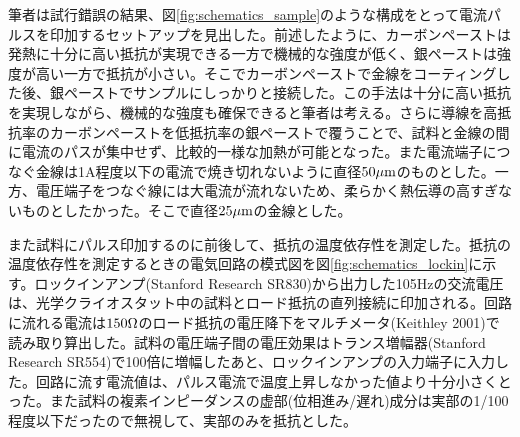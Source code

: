 筆者は試行錯誤の結果、図\ref{fig:schematics_sample}のような構成をとって電流パルスを印加するセットアップを見出した。前述したように、カーボンペーストは発熱に十分に高い抵抗が実現できる一方で機械的な強度が低く、銀ペーストは強度が高い一方で抵抗が小さい。そこでカーボンペーストで金線をコーティングした後、銀ペーストでサンプルにしっかりと接続した。この手法は十分に高い抵抗を実現しながら、機械的な強度も確保できると筆者は考える。さらに導線を高抵抗率のカーボンペーストを低抵抗率の銀ペーストで覆うことで、試料と金線の間に電流のパスが集中せず、比較的一様な加熱が可能となった。また電流端子につなぐ金線は1A程度以下の電流で焼き切れないように直径$\rm 50 \mu m$のものとした。一方、電圧端子をつなぐ線には大電流が流れないため、柔らかく熱伝導の高すぎないものとしたかった。そこで直径$\rm 25 \mu m$の金線とした。

また試料にパルス印加するのに前後して、抵抗の温度依存性を測定した。抵抗の温度依存性を測定するときの電気回路の模式図を図\ref{fig:schematics_lockin}に示す。ロックインアンプ(Stanford Research SR830)から出力した105Hzの交流電圧は、光学クライオスタット中の試料とロード抵抗の直列接続に印加される。回路に流れる電流は$\rm 150\Omega$のロード抵抗の電圧降下をマルチメータ(Keithley 2001)で読み取り算出した。試料の電圧端子間の電圧効果はトランス増幅器(Stanford Research SR554)で100倍に増幅したあと、ロックインアンプの入力端子に入力した。回路に流す電流値は、パルス電流で温度上昇しなかった値より十分小さくとった。また試料の複素インピーダンスの虚部(位相進み/遅れ)成分は実部の1/100程度以下だったので無視して、実部のみを抵抗とした。


